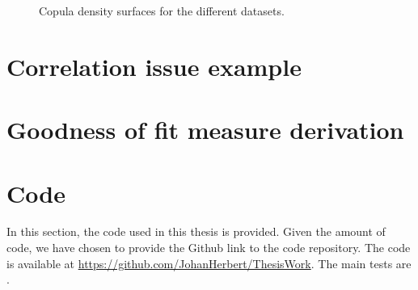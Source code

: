 \documentclass[%
a4paper,							
11pt,								
bibliography=totoc,						
abstracton=true					
]
{scrartcl}
\theoremstyle{plain}
\theoremstyle{definition}
\theoremstyle{remark}
\newcommand{\1}{\mathbbm{1}}
\begin{document}
\begin{figure}[H]
\begin{minipage}{0.45\textwidth}
    \end{minipage}
    \caption{Copula density surfaces for the different datasets.}
    \label{fig:NeuralCopulaGradient}
\end{figure}

\newpage
\section{Correlation issue example }\label{sec:CorrelationNotWorking}


\newpage
\section{Goodness of fit measure derivation}\label{sec:DistanceDerivation}




\newpage
\section{Code}\label{sec:Code}
In this section, the code used in this thesis is provided. Given the amount of code, we have chosen to provide the Github link to the code repository. The code is available at \url{https://github.com/JohanHerbert/ThesisWork}. The main tests are . 


\end{document}
